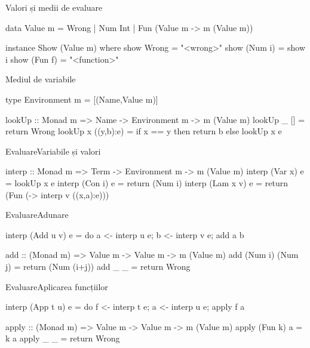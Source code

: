 \documentclass[xcolor=pdftex,romanian,colorlinks]{beamer}
\begin{document}
\begin{frame}[fragile]
{Valori și medii de evaluare}
\begin{asciihs}
data Value m
  = Wrong
  | Num Int
  | Fun (Value m -> m (Value m))
  
instance Show (Value m) where
  show Wrong = "<wrong>"
  show (Num i) = show i
  show (Fun f) = "<function>"
\end{asciihs}
\end{frame}

\begin{frame}[fragile]
{Mediul de variabile}
\begin{asciihs}
type Environment m = [(Name,Value m)]

lookUp :: Monad m => Name -> Environment m -> m (Value m)
lookUp _ [] 
  = return Wrong
lookUp x ((y,b):e)
  = if x == y then return b else lookUp x e
\end{asciihs}
\end{frame}

\begin{frame}[fragile]
{Evaluare}{Variabile și valori}
\begin{asciihs}
interp :: Monad m => Term -> Environment m -> m (Value m)
interp (Var x) e   = lookUp x e
interp (Con i) e   = return (Num i)
interp (Lam x v) e = return (Fun (\a -> interp v ((x,a):e)))
\end{asciihs}
\end{frame}



\begin{frame}[fragile]
{Evaluare}{Adunare}
\begin{asciihs}
interp (Add u v) e = 
  do {
    a <- interp u e;
    b <- interp v e;
    add a b
  }

add :: (Monad m) => Value m -> Value m -> m (Value m)
add (Num i) (Num j) = return (Num (i+j))
add _       _       = return Wrong
\end{asciihs}
\end{frame}

\begin{frame}[fragile]
{Evaluare}{Aplicarea funcțiilor}
\begin{asciihs}
interp (App t u) e = 
  do {
    f <- interp t e;
    a <- interp u e;
    apply f a
  }


apply :: (Monad m) => Value m -> Value m -> m (Value m)
apply (Fun k) a = k a
apply _ _ = return Wrong
\end{asciihs}
\end{frame}
\end{document}
